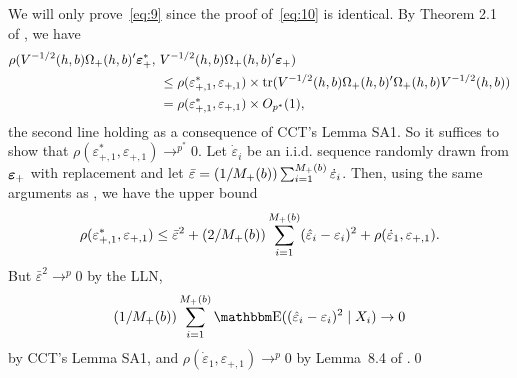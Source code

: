 \documentclass[12pt,fleqn]{article}
\begin{document}
We will only prove~\eqref{eq:9} since the proof of~\eqref{eq:10} is
identical. By Theorem 2.1 of \cite{freedman1981}, we have
\begin{align*}
  \rho(V^{-1/2}(h,b) \Omega_+(h,b)'\epb_{+}^{*},\
  &V^{-1/2}(h,b) \Omega_+(h,b)'\epb_{+}) \\
  &\leq \rho(\varepsilon_{+,1}^{*}, \varepsilon_{+,1}) \times
    \tr(V^{-1/2}(h,b) \Omega_+(h,b)' \Omega_+(h,b)V^{-1/2}(h,b)) \\
  &= \rho(\varepsilon_{+,1}^{*}, \varepsilon_{+,1}) \times O_{p^{*}}(1),
\end{align*}
the second line holding as a consequence of CCT's Lemma SA1. So it suffices
to show that $\rho(\varepsilon_{+,1}^{*}, \varepsilon_{+,1}) \to^{p^{*}} 0$. Let
$\dot{\varepsilon}_i$ be an i.i.d. sequence randomly drawn from $\epb_+$
with replacement and let
$\bar{\varepsilon} = (1/M_+(b)) \osum[+]{i}{b} \dot{\varepsilon}_i$. Then,
using the same arguments as \cite{freedman1981}, we have the upper bound
\begin{equation*}
  \rho(\varepsilon_{+,1}^*, \varepsilon_{+,1})
  \leq
  \bar\varepsilon^2 +
  (2/M_+(b)) \osum[+]{i}{b} (\hat\varepsilon_i - \varepsilon_i)^2
  + \rho(\dot\varepsilon_1, \varepsilon_{+,1}).
\end{equation*}
But $\bar\varepsilon^2 \to^p 0$ by the LLN,
\[
  (1/M_+(b)) \osum[+]{i}{b}
  \E((\hat\varepsilon_i - \varepsilon_i)^2 \mid X_i) \to 0
\]
by CCT's Lemma SA1, and
$\rho(\dot\varepsilon_1, \varepsilon_{+,1}) \to^p 0$ by Lemma~8.4 of
\cite{bickel1981}.\qed

\clearpage


\end{document}
